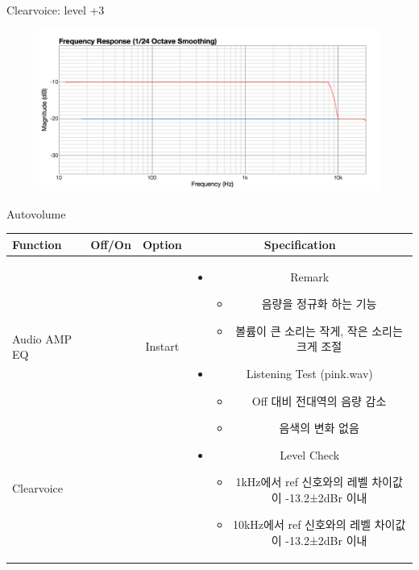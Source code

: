 \documentclass{beamer}
\begin{document}
\begin{frame}[t]{Clearvoice: level +3}
		\begin{figure}[b]
			\includegraphics[height=0.32\textwidth]{figure/cv3.png}
		\end{figure}
		
	\end{frame}
	
	
	\begin{frame}[t]{Autovolume}
		\begin{tiny}
			\begin{tabular}{@{}lccc@{}}
				\toprule
				Function & Off/On & Option & Specification \\
				\midrule
				Audio AMP EQ & \color{black}{Off} & Instart &
				\multirow{14}{60mm}{
					\begin{itemize}
						\item Remark
						\begin{itemize}
							\item 음량을 정규화 하는 기능
							\item 볼륨이 큰 소리는 작게, 작은 소리는 크게 조절
						\end{itemize}
						\item Listening Test (pink.wav)
						\begin{itemize}
							\item Off 대비 전대역의 음량 감소
							\item 음색의 변화 없음
						\end{itemize}
						\item Level Check
						\begin{itemize}
							\item 1kHz에서 ref 신호와의 레벨 차이값이 -13.2±2dBr 이내
							\item 10kHz에서 ref 신호와의 레벨 차이값이 -13.2±2dBr 이내
						\end{itemize}
					\end{itemize}
				} \\
				Clearvoice & \color{black}{Off} & & \\
				\color{blue}{Autovolume} & \color{blue}{On} & & \\

\end{tabular}
\end{tiny}
\end{frame}
\end{document}
